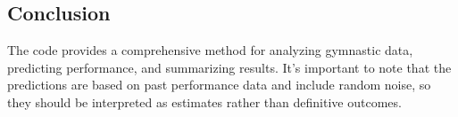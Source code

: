 \documentclass[11pt]{article}
\begin{document}
\subsection{Conclusion}
The code provides a comprehensive method for analyzing gymnastic data, predicting performance, and summarizing results. It's important to note that the predictions are based on past performance data and include random noise, so they should be interpreted as estimates rather than definitive outcomes.
\end{document}
